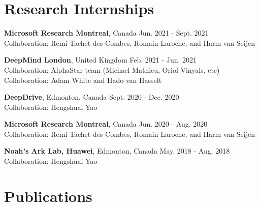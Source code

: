 \documentclass[margin, 10pt]{res} %
\begin{document}
\begin{resume}
\section{Research Internships}

{\textbf{Microsoft Research Montreal}, Canada} \hfill Jun. 2021 - Sept. 2021 \\
Collaboration: Remi Tachet des Combes, Romain Laroche, and Harm van Seijen  

{\textbf{DeepMind London}, United Kingdom} \hfill Feb. 2021 - Jun. 2021 \\
Collaboration: AlphaStar team (Michael Mathieu, Oriol Vinyals, etc) \\
Collaboration: Adam White and Hado van Hasselt

{\textbf{DeepDrive}, Edmonton, Canada} \hfill Sept. 2020 - Dec. 2020 \\
Collaboration: Hengshuai Yao

{\textbf{Microsoft Research Montreal}, Canada} \hfill Jun. 2020 - Aug. 2020 \\
Collaboration: Remi Tachet des Combes, Romain Laroche, and Harm van Seijen  

{\textbf{Noah's Ark Lab, Huawei}, Edmonton, Canada} \hfill May. 2018 - Aug. 2018 \\
Collaboration: Hengshuai Yao

\section{Publications}


\end{resume}
\end{document}
